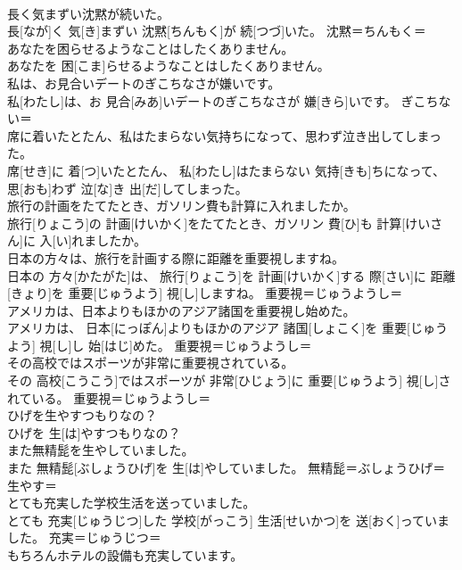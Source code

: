 \documentclass[8pt]{extreport}
\begin{document}
\begin{CJK}{UTF8}{min}
\\	長く気まずい沈黙が続いた。	
\\	長[なが]く 気[き]まずい 沈黙[ちんもく]が 続[つづ]いた。	沈黙＝ちんもく＝ 
\\	あなたを困らせるようなことはしたくありません。	
\\	あなたを 困[こま]らせるようなことはしたくありません。	
\\	私は、お見合いデートのぎこちなさが嫌いです。	
\\	私[わたし]は、お 見合[みあ]いデートのぎこちなさが 嫌[きら]いです。	ぎこちない＝ 
\\	席に着いたとたん、私はたまらない気持ちになって、思わず泣き出してしまった。	
\\	席[せき]に 着[つ]いたとたん、 私[わたし]はたまらない 気持[きも]ちになって、 思[おも]わず 泣[な]き 出[だ]してしまった。	
\\	旅行の計画をたてたとき、ガソリン費も計算に入れましたか。	
\\	旅行[りょこう]の 計画[けいかく]をたてたとき、ガソリン 費[ひ]も 計算[けいさん]に 入[い]れましたか。	
\\	日本の方々は、旅行を計画する際に距離を重要視しますね。	
\\	日本の 方々[かたがた]は、 旅行[りょこう]を 計画[けいかく]する 際[さい]に 距離[きょり]を 重要[じゅうよう] 視[し]しますね。	重要視＝じゅうようし＝ 
\\	アメリカは、日本よりもほかのアジア諸国を重要視し始めた。	
\\	アメリカは、 日本[にっぽん]よりもほかのアジア 諸国[しょこく]を 重要[じゅうよう] 視[し]し 始[はじ]めた。	重要視＝じゅうようし＝ 
\\	その高校ではスポーツが非常に重要視されている。	
\\	その 高校[こうこう]ではスポーツが 非常[ひじょう]に 重要[じゅうよう] 視[し]されている。	重要視＝じゅうようし＝ 
\\	ひげを生やすつもりなの？	
\\	ひげを 生[は]やすつもりなの？	
\\	また無精髭を生やしていました。	
\\	また 無精髭[ぶしょうひげ]を 生[は]やしていました。	無精髭＝ぶしょうひげ＝ 
\\	生やす＝ 
\\	とても充実した学校生活を送っていました。	
\\	とても 充実[じゅうじつ]した 学校[がっこう] 生活[せいかつ]を 送[おく]っていました。	充実＝じゅうじつ＝ 
\\	もちろんホテルの設備も充実しています。	

\end{CJK}
\end{document}

